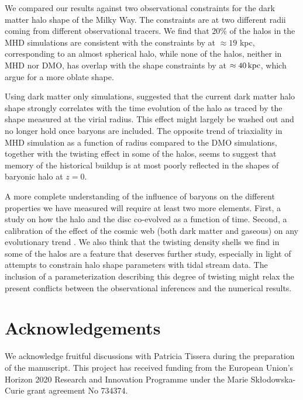 \documentclass[usenatbib]{mnras}
\begin{document}
We compared our results against two observational constraints for the
dark matter halo shape of the Milky Way. The constraints are at two different radii
coming from different observational tracers. 
We find that $20\%$ of the halos in the MHD simulations are consistent with
the constraints by \cite{Bovy16} at $\approx 19$ kpc,  corresponding to
an almost spherical halo, while none of the halos, neither in MHD nor
DMO, has overlap with the shape constraints by \cite{LM10} at
$\approx 40\,{\rm kpc}$, which argue for a more oblate shape.

Using dark matter only simulations, \citet{VeraCiro11} suggested that
the current dark matter halo shape strongly correlates with the time
evolution of the halo as traced by the shape measured at the virial radius. 
This effect might largely be washed out and no longer hold once baryons are included. 
The opposite trend of triaxiality in MHD simulation as a function of
radius compared to the DMO simulations, together with the twisting effect in some of 
the halos, seems to suggest that memory of the historical buildup is at most poorly 
reflected in the shapes of baryonic halo at $z=0$.


A more complete understanding of the influence of baryons on the
different properties we have measured will require at least two more elements.
First, a study on how the halo and the disc co-evolved as a
function of time. Second, a calibration of the effect of the cosmic web
(both dark matter and gaseous) on any evolutionary trend
\citep{2014MNRAS.443.1090F, 2017MNRAS.469..594B, 2019MNRAS.487.1607G}.
We also think  that the twisting density shells we find in
some of the halos are a feature that deserves further study, especially
in light of attempts to  constrain halo shape parameters with tidal stream data.  The
inclusion of a parameterization describing this degree of twisting
might relax the present conflicts between the observational inferences and the
numerical results.  


\section*{Acknowledgements}
We acknowledge fruitful discussions with Patricia Tissera during the
preparation of the manuscript.
This project has received funding from the European Union's Horizon
2020 Research and Innovation Programme under the Marie
Sk\l{}odowska-Curie grant agreement No 734374. 



\end{document}
